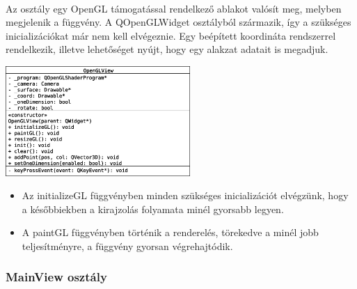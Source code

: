 \documentclass[12pt]{report}
\begin{document}
\paragraph{}
Az osztály egy OpenGL támogatással rendelkező ablakot valósít meg, melyben megjelenik a függvény. A QOpenGLWidget osztályból származik, így a szükséges inicializációkat már nem kell elvégeznie. Egy beépített koordináta rendszerrel rendelkezik, illetve lehetőséget nyújt, hogy egy alakzat adatait is megadjuk.
\begin{center}
\includegraphics[width=7cm]{pics/uml/OpenGLView}
\end{center}
\begin{itemize}
\item Az initializeGL függvényben minden szükséges inicializációt elvégzünk, hogy a későbbiekben a kirajzolás folyamata minél gyorsabb legyen.
\item A paintGL függvényben történik a renderelés, törekedve a minél jobb teljesítményre, a függvény gyorsan végrehajtódik.
\end{itemize}

\subsubsection{MainView osztály}
\end{document}
